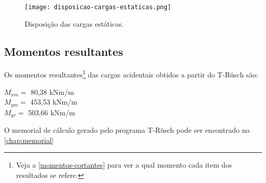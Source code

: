 \begin{figure}[htb]
	\caption{\label{disposicao-cargas-estaticas}Disposição das cargas estáticas.}
	\begin{center}
	    \texttt{[image: disposicao-cargas-estaticas.png]}
	\end{center}
\end{figure}

\subsection{Momentos resultantes}

Os momentos resultantes\footnote{Veja a \autoref{momentos-cortantes} para ver a qual momento cada item dos resultados se refere.} das cargas acidentais obtidos a partir do T-Rüsch são:


$ M_{xm} = $ 80,38 kNm/m \\ \indent
$ M_{ym} = $ 453,53 kNm/m \\ \indent
$ M_{yr} = $ 503,66 kNm/m

O memorial de cálculo gerado pelo programa T-Rüsch pode ser encontrado no \autoref{chap:memorial}